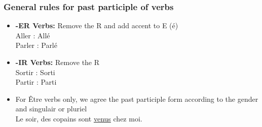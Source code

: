 \subsubsection{General rules for past participle of verbs}

\begin{itemize}
\item{\textbf{-ER Verbs:} Remove the R and add accent to E (\'e)\\
Aller : All\'e\\
Parler : Parl\'e}
\item{\textbf{-IR Verbs:} Remove the R\\
Sortir : Sorti\\
Partir : Parti}
\item{For \^Etre verbs only, we agree the past participle form according to
the gender and singulair or pluriel\\
Le soir, des copains sont \ul{venus} chez moi.}
\end{itemize}




